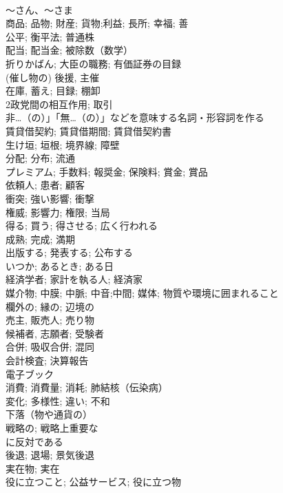 \documentclass[8pt]{extreport}
\begin{document}
\begin{CJK}{UTF8}{min}
\\	〜さん、〜さま	
\\	商品; 品物; 財産; 貨物;利益; 長所; 幸福; 善	
\\	公平; 衡平法; 普通株	
\\	配当; 配当金; 被除数（数学）	
\\	折りかばん; 大臣の職務; 有価証券の目録	
\\	(催し物の) 後援, 主催	
\\	在庫, 蓄え; 目録; 棚卸	
\\	2政党間の相互作用; 取引	
\\	非…（の）」「無…（の）」などを意味する名詞・形容詞を作る	
\\	賃貸借契約; 賃貸借期間; 賃貸借契約書	
\\	生け垣; 垣根; 境界線; 障壁	
\\	分配; 分布; 流通	
\\	プレミアム; 手数料; 報奨金; 保険料; 賞金; 賞品	
\\	依頼人; 患者; 顧客	
\\	衝突; 強い影響; 衝撃	
\\	権威; 影響力; 権限; 当局	
\\	得る; 買う; 得させる; 広く行われる	
\\	成熟; 完成; 満期
\\	出版する; 発表する; 公布する	
\\	いつか; あるとき; ある日	
\\	経済学者; 家計を執る人; 経済家	
\\	媒介物; 中膜; 中脈; 中音;中間; 媒体; 物質や環境に囲まれること	
\\	欄外の; 縁の; 辺境の	
\\	売主, 販売人; 売り物	
\\	候補者, 志願者; 受験者	
\\	合併; 吸収合併; 混同	
\\	会計検査; 決算報告	
\\	電子ブック	
\\	消費; 消費量; 消耗; 肺結核（伝染病）	
\\	変化; 多様性; 違い; 不和	
\\	下落（物や通貨の）	
\\	戦略の; 戦略上重要な	
\\	に反対である	
\\	後退; 退場; 景気後退	
\\	実在物; 実在	
\\	役に立つこと; 公益サービス; 役に立つ物	

\end{CJK}
\end{document}
